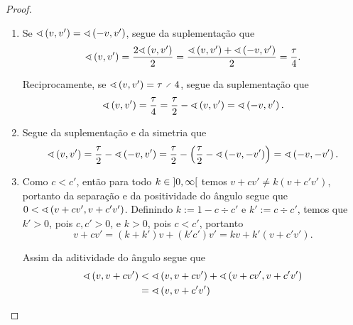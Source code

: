 \begin{proposition}
\begin{enumerate}
	\end{enumerate}
\end{proposition}
\begin{proof}
	\begin{enumerate}
		\item Se $\sphericalangle\left({v},{v'}\right)=\sphericalangle\left({-v},{v'}\right)$, segue da suplementação que
			\begin{equation*}
				\sphericalangle\left({v},{v'}\right) = \frac{2\sphericalangle\left({v},{v'}\right)}{2} = \frac{\sphericalangle\left({v},{v'}\right)+\sphericalangle\left({-v},{v'}\right)}{2} = \frac{\tau}{4}.
			\end{equation*}

			Reciprocamente, se $\ang{v}{v'}=\tau \div 4$, segue da suplementação que
				\begin{equation*}
					\sphericalangle\left({v},{v'}\right) = \frac{\tau}{4} = \frac{\tau}{2} - \sphericalangle\left({v},{v'}\right) = \sphericalangle\left({-v},{v'}\right).
				\end{equation*}

		\item Segue da suplementação e da simetria que
				\begin{equation*}
					\sphericalangle\left({v},{v'}\right) = \frac{\tau}{2} - \sphericalangle\left({-v},{v'}\right) = \frac{\tau}{2} - \left(\frac{\tau}{2} - \sphericalangle\left({-v},{-v'}\right)\right) = \sphericalangle\left({-v},{-v'}\right).
				\end{equation*}

		\item Como $c<c'$, então para todo $k \in \left]{0},{\infty}\right[$ temos $v+cv' \neq k(v+c'v')$, portanto da separação e da positividade do ângulo segue que $0 < \sphericalangle\left({v+cv'},{v+c'v'}\right)$. Definindo $k := 1 - c \div c'$ e $k' := c \div c'$, temos que $k'>0$, pois $c,c'>0$, e $k>0$, pois $c<c'$, portanto
				\begin{equation*}
					v+cv' = (k+k')v + (k'c')v'= kv+k'(v+c'v').
				\end{equation*}

		Assim da aditividade do ângulo segue que
				\begin{align*}
					\sphericalangle\left({v},{v+cv'}\right) &< \sphericalangle\left({v},{v+cv'}\right) + \sphericalangle\left({v+cv'},{v+c'v'}\right) \\
						&= \sphericalangle\left({v},{v+c'v'}\right)
				\end{align*}


\end{enumerate}
\end{proof}
